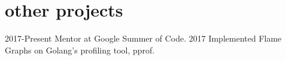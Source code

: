 \section{other projects}

\begin{entrylist}
    \simpleentry
      {2017-Present}
      {Mentor at Google Summer of Code.}
      {}
    \simpleentry
      {2017}
      {Implemented Flame Graphs on Golang's profiling tool, pprof.}
      {}
\end{entrylist}
